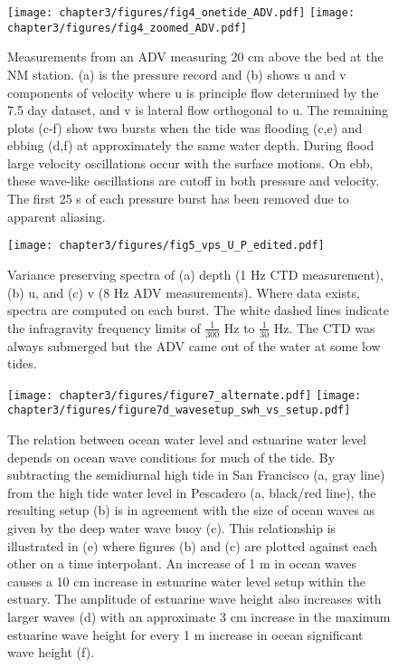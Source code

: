 \begin{figure}
\texttt{[image: chapter3/figures/fig4\_onetide\_ADV.pdf]}
\texttt{[image: chapter3/figures/fig4\_zoomed\_ADV.pdf]}
\protect\caption{Measurements from an ADV measuring 20 cm above the bed at the NM station.
(a) is the pressure record and (b) shows u and v components of velocity
where u is principle flow determined by the 7.5 day dataset, and v
is lateral flow orthogonal to u. The remaining plots (c-f) show two
bursts when the tide was flooding (c,e) and ebbing (d,f) at approximately
the same water depth. During flood large velocity oscillations occur
with the surface motions. On ebb, these wave-like oscillations are
cutoff in both pressure and velocity. The first 25 s of each pressure
burst has been removed due to apparent aliasing. \label{f5_adv}}
\end{figure}


\begin{figure}
\texttt{[image: chapter3/figures/fig5\_vps\_U\_P\_edited.pdf]}

\protect\caption{Variance preserving spectra of (a) depth (1 Hz CTD measurement), (b)
u, and (c) v (8 Hz ADV measurements). Where data exists, spectra are
computed on each burst. The white dashed lines indicate the infragravity
frequency limits of $\frac{1}{300}$ Hz to $\frac{1}{30}$ Hz. The
CTD was always submerged but the ADV came out of the water at some
low tides. \label{f6_spectra}}
\end{figure}


\begin{figure}
\texttt{[image: chapter3/figures/figure7\_alternate.pdf]}
\texttt{[image: chapter3/figures/figure7d\_wavesetup\_swh\_vs\_setup.pdf]}\protect\caption{The relation between ocean water level and estuarine water level depends
on ocean wave conditions for much of the tide. By subtracting the
semidiurnal high tide in San Francisco (a, gray line) from the high
tide water level in Pescadero (a, black/red line), the resulting setup
(b) is in agreement with the size of ocean waves as given by the deep
water wave buoy (c). This relationship is illustrated in (e) where
figures (b) and (c) are plotted against each other on a time interpolant.
An increase of 1 m in ocean waves causes a 10 cm increase in estuarine
water level setup within the estuary. The amplitude of estuarine wave
height also increases with larger waves (d) with an approximate 3
cm increase in the maximum estuarine wave height for every 1 m increase
in ocean significant wave height (f). \label{f7_setup}}
\end{figure}


